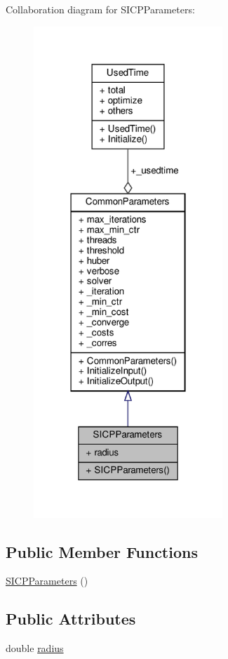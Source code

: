 Collaboration diagram for S\+I\+C\+P\+Parameters\+:\nopagebreak
\begin{figure}[H]
\begin{center}
\leavevmode
\includegraphics[width=202pt]{d5/d94/structSICPParameters__coll__graph}
\end{center}
\end{figure}
\subsection*{Public Member Functions}
\begin{DoxyCompactItemize}
\item 
\hyperlink{structSICPParameters_a441567a2596ba3857dc19cf178d829db}{S\+I\+C\+P\+Parameters} ()
\end{DoxyCompactItemize}
\subsection*{Public Attributes}
\begin{DoxyCompactItemize}
\item 
double \hyperlink{structSICPParameters_abb46fdfaa6bf8d14556c2b75f0db5828}{radius}
\end{DoxyCompactItemize}


